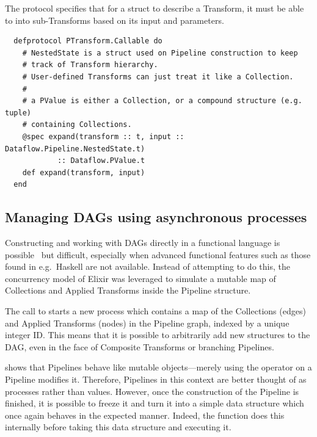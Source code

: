 \begin{codelisting}
	\caption[The definition of the  protocol.]{The  protocol specifies that for a struct to describe a Transform, it must be able to  into sub-Transforms based on its input and parameters.}
	\label{lst:impl:ptransform-callable}
	\begin{verbatim}
  defprotocol PTransform.Callable do
    # NestedState is a struct used on Pipeline construction to keep
    # track of Transform hierarchy.
    # User-defined Transforms can just treat it like a Collection.
    # 
    # a PValue is either a Collection, or a compound structure (e.g. tuple)
    # containing Collections.
    @spec expand(transform :: t, input :: Dataflow.Pipeline.NestedState.t)
            :: Dataflow.PValue.t
    def expand(transform, input)
  end
	\end{verbatim}
	
\end{codelisting}


\subsection{Managing DAGs using asynchronous processes}

Constructing and working with DAGs directly in a functional language is possible~\cite{Gibbons1995} but difficult, especially when advanced functional features such as those found in e.g.\ Haskell are not available.
Instead of attempting to do this, the concurrency model of Elixir was leveraged to simulate a mutable map of Collections and Applied Transforms inside the Pipeline structure.

The call to  starts a new process which contains a map of the Collections (edges) and Applied Transforms (nodes) in the Pipeline graph, indexed by a unique integer ID.
This means that it is possible to arbitrarily add new structures to the DAG, even in the face of Composite Transforms or branching Pipelines.

 shows that Pipelines behave like mutable objects---merely using the \exs{~>} operator on a Pipeline modifies it.
Therefore, Pipelines in this context are better thought of as processes rather than values.
However, once the construction of the Pipeline is finished, it is possible to freeze it and turn it into a simple data structure which once again behaves in the expected manner.
Indeed, the  function does this internally before taking this data structure and executing it.

